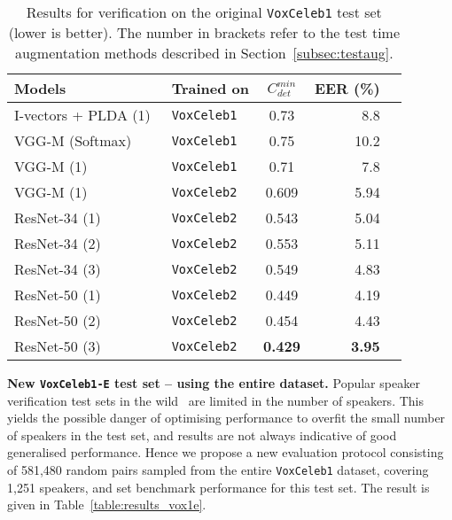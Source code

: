 \documentclass[a4paper]{article}
\def\newpara{\vspace{2pt}}
\def\aftertab{\vspace{-22pt}}
\begin{document}
\begin{table}[h!]
\centering
\footnotesize
\begin{tabular}{ l  l c r  r  }

\textbf{Models}             					& \textbf{Trained on} & $C^{min}_{det}$ & EER (\%) \\ \hline  
 I-vectors + PLDA (1)~\cite{Nagrani17}				& \texttt{VoxCeleb1}      & 0.73     & 8.8    \\
 VGG-M (Softmax)~\cite{Nagrani17}		& \texttt{VoxCeleb1} & 0.75    & 10.2 \\ 
 VGG-M 	(1)		~\cite{Nagrani17}		& \texttt{VoxCeleb1} & 0.71    & 7.8 \\ 
 VGG-M 	(1)									  	& \texttt{VoxCeleb2} & 0.609 & 5.94 \\  \hline  
 
 ResNet-34 	(1)							& \texttt{VoxCeleb2} &  0.543 & 5.04 \\
 ResNet-34 	(2)							& \texttt{VoxCeleb2} &  0.553 & 5.11 \\
 ResNet-34 	(3)							& \texttt{VoxCeleb2} &  0.549 & 4.83 \\ \hline  
 
 ResNet-50 	(1)							& \texttt{VoxCeleb2} & 0.449 & 4.19 \\
 ResNet-50 	(2)							& \texttt{VoxCeleb2} & 0.454 & 4.43 \\
 ResNet-50	(3)							& \texttt{VoxCeleb2} &  \textbf{0.429} & \textbf{3.95}  \\ \hline  

\end{tabular} 
\caption{Results for verification on the original {\tt VoxCeleb1} test set (lower is better). The number in brackets refer to the test time augmentation methods described in Section~\ref{subsec:testaug}.}
\label{table:results}
\normalsize
\aftertab
\end{table}

\newpara\noindent\textbf{New \texttt{VoxCeleb1-E} test set --  using the entire dataset.}
Popular speaker verification test sets in the wild~\cite{Nagrani17, Mclaren16} are limited in the number of speakers. This yields the possible danger of optimising performance to overfit
the small number of speakers in the test set, and results are not
always indicative of good generalised performance. Hence we propose a
new evaluation protocol consisting of 581,480 random pairs sampled from the
entire \texttt{VoxCeleb1} dataset, covering 1,251 speakers, and set benchmark
performance for this test set.
The result is given in Table~\ref{table:results_vox1e}.
\end{document}
